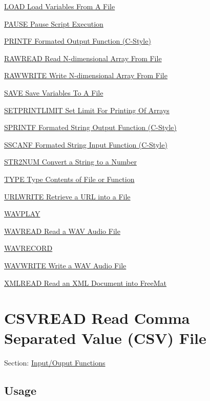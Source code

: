 \begin{DoxyItemize}
\item \hyperlink{io_load}{L\-O\-A\-D Load Variables From A File}  
\item \hyperlink{io_pause}{P\-A\-U\-S\-E Pause Script Execution}  
\item \hyperlink{io_printf}{P\-R\-I\-N\-T\-F Formated Output Function (C-\/\-Style)}  
\item \hyperlink{io_rawread}{R\-A\-W\-R\-E\-A\-D Read N-\/dimensional Array From File}  
\item \hyperlink{io_rawwrite}{R\-A\-W\-W\-R\-I\-T\-E Write N-\/dimensional Array From File}  
\item \hyperlink{io_save}{S\-A\-V\-E Save Variables To A File}  
\item \hyperlink{io_setprintlimit}{S\-E\-T\-P\-R\-I\-N\-T\-L\-I\-M\-I\-T Set Limit For Printing Of Arrays}  
\item \hyperlink{io_sprintf}{S\-P\-R\-I\-N\-T\-F Formated String Output Function (C-\/\-Style)}  
\item \hyperlink{io_sscanf}{S\-S\-C\-A\-N\-F Formated String Input Function (C-\/\-Style)}  
\item \hyperlink{io_str2num}{S\-T\-R2\-N\-U\-M Convert a String to a Number}  
\item \hyperlink{io_type}{T\-Y\-P\-E Type Contents of File or Function}  
\item \hyperlink{io_urlwrite}{U\-R\-L\-W\-R\-I\-T\-E Retrieve a U\-R\-L into a File}  
\item \hyperlink{io_wavplay}{W\-A\-V\-P\-L\-A\-Y}  
\item \hyperlink{io_wavread}{W\-A\-V\-R\-E\-A\-D Read a W\-A\-V Audio File}  
\item \hyperlink{io_wavrecord}{W\-A\-V\-R\-E\-C\-O\-R\-D}  
\item \hyperlink{io_wavwrite}{W\-A\-V\-W\-R\-I\-T\-E Write a W\-A\-V Audio File}  
\item \hyperlink{io_xmlread}{X\-M\-L\-R\-E\-A\-D Read an X\-M\-L Document into Free\-Mat}  
\end{DoxyItemize}\hypertarget{io_csvread}{}\section{C\-S\-V\-R\-E\-A\-D Read Comma Separated Value (C\-S\-V) File}\label{io_csvread}
Section\-: \hyperlink{sec_io}{Input/\-Ouput Functions} \hypertarget{vtkwidgets_vtkxyplotwidget_Usage}{}\subsection{Usage}\label{vtkwidgets_vtkxyplotwidget_Usage}
